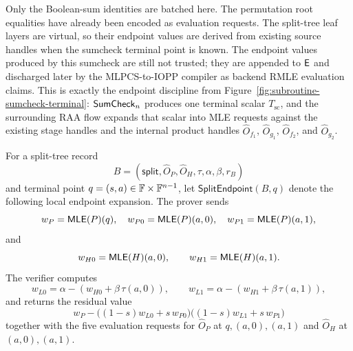 Only the Boolean-sum identities are batched here.  The permutation root
equalities have already been encoded as evaluation requests.  The split-tree
leaf layers are virtual, so their endpoint values are derived from existing
source handles when the sumcheck terminal point is known.  The endpoint values
produced by this sumcheck are still not trusted; they are appended to
\(\mathsf{E}\) and discharged later by the MLPCS-to-IOPP compiler as backend
RMLE evaluation claims.
This is exactly the endpoint discipline from
Figure~\ref{fig:subroutine-sumcheck-terminal}: \(\mathsf{SumCheck}_n\) produces one
terminal scalar \(T_{\mathrm{sc}}\), and the surrounding RAA flow expands that
scalar into MLE requests against the existing stage handles and the internal
product handles \(\widehat O_{f_1}\), \(\widehat O_{g_1}\),
\(\widehat O_{f_2}\), and \(\widehat O_{g_2}\).

For a split-tree record
\[
  B=(\mathsf{split},\widehat O_P,\widehat O_H,\tau,\alpha,\beta,r_B)
\]
and terminal point \(q=(s,a)\in\mathbb{F}\times\mathbb{F}^{n-1}\), let
\(\mathsf{SplitEndpoint}(B,q)\) denote the following local endpoint expansion.  The
prover sends
\[
  w_P=\mathsf{MLE}(P)(q),\quad
  w_{P0}=\mathsf{MLE}(P)(a,0),\quad
  w_{P1}=\mathsf{MLE}(P)(a,1),
\]
and
\[
  w_{H0}=\mathsf{MLE}(H)(a,0),\qquad
  w_{H1}=\mathsf{MLE}(H)(a,1).
\]
The verifier computes
\[
  w_{L0}=\alpha-(w_{H0}+\beta\,\tau(a,0)),
  \qquad
  w_{L1}=\alpha-(w_{H1}+\beta\,\tau(a,1)),
\]
and returns the residual value
\[
  w_P-\bigl((1-s)w_{L0}+s\,w_{P0}\bigr)
      \bigl((1-s)w_{L1}+s\,w_{P1}\bigr)
\]
together with the five evaluation requests for
\(\widehat O_P\) at \(q,(a,0),(a,1)\) and \(\widehat O_H\) at
\((a,0),(a,1)\).

